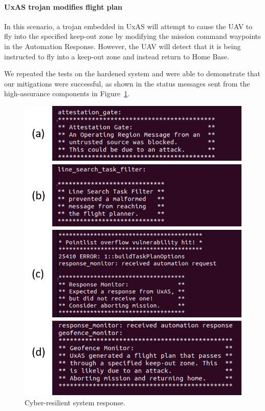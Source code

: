 \paragraph{UxAS trojan modifies flight plan} In this scenario, a trojan embedded in UxAS will attempt to cause the UAV to fly into the specified keep-out zone by modifying the mission command waypoints in the Automation Response.  However, the UAV will detect that it is being instructed to fly into a keep-out zone and instead return to Home Base.

We repeated the tests on the hardened system and were able to demonstrate that our mitigations were successful, as shown in the status messages sent from the high-assurance components in Figure~\ref{fig:mitigation-output}.

\begin{figure}[h]
	\centering
	\includegraphics[width=1\columnwidth]{figs/mitigation-output.png}
	\caption{Cyber-resilient system response.} 
	\label{fig:mitigation-output} 
\end{figure}

